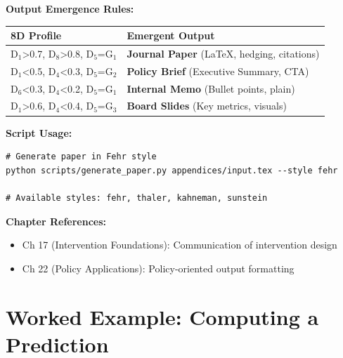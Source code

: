 \begin{tcolorbox}[colback=purple!5!white, colframe=purple!75!black,
    title=\textbf{Stage 5 Deep Dive: 8D Document Framework}]
\vspace{0.5em}
\textbf{Output Emergence Rules:}

\begin{center}
\small
\begin{tabular}{|l|l|}
\hline
\textbf{8D Profile} & \textbf{Emergent Output} \\
\hline
\hline
D$_1$>0.7, D$_8$>0.8, D$_5$=G$_1$ & \textbf{Journal Paper} (LaTeX, hedging, citations) \\
D$_1$<0.5, D$_4$<0.3, D$_5$=G$_2$ & \textbf{Policy Brief} (Executive Summary, CTA) \\
D$_6$<0.3, D$_4$<0.2, D$_5$=G$_1$ & \textbf{Internal Memo} (Bullet points, plain) \\
D$_1$>0.6, D$_4$<0.4, D$_5$=G$_3$ & \textbf{Board Slides} (Key metrics, visuals) \\
\hline
\end{tabular}
\end{center}

\vspace{0.5em}
\textbf{Script Usage:}
\begin{verbatim}
# Generate paper in Fehr style
python scripts/generate_paper.py appendices/input.tex --style fehr

# Available styles: fehr, thaler, kahneman, sunstein
\end{verbatim}

\vspace{0.5em}
\textbf{Chapter References:}
\begin{itemize}[nosep]
    \item Ch 17 (Intervention Foundations): Communication of intervention design
    \item Ch 22 (Policy Applications): Policy-oriented output formatting
\end{itemize}

\end{tcolorbox}

\section{Worked Example: Computing a Prediction}
\label{sec:dp-example}

